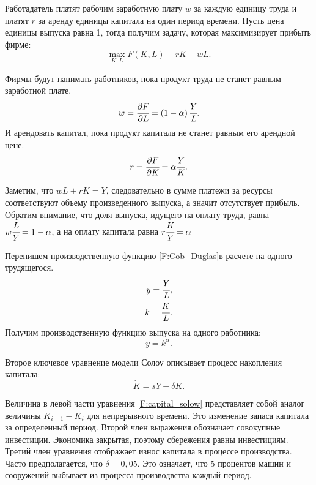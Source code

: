 Работадатель платят рабочим заработную плату $w$ за каждую единицу труда и платят $r$ за аренду единицы капитала на один период времени.
Пусть цена единицы выпуска равна 1, тогда получим задачу, которая максимизирует прибыть фирме:
\begin{equation}
	\max\limits_{K, L} F(K,L) - rK - wL\text{.}
\end{equation}

Фирмы будут нанимать работников, пока продукт труда не станет равным заработной плате.
\begin{equation*}
	w = \cfrac{\partial F}{\partial L} = \left(1-\alpha\right)\cfrac{Y}{L}\text{.}
\end{equation*}
И арендовать капитал, пока продукт капитала не станет равным его арендной цене.
\begin{equation*}
	r = \cfrac{\partial F}{\partial K} = \alpha\cfrac{Y}{K}\text{.}
\end{equation*}

Заметим, что $wL + rK = Y$, следовательно в сумме платежи за ресурсы соответствуют объему произведенного выпуска, а значит отсутствует прибыль.
Обратим внимание, что доля выпуска, идущего на оплату труда, равна $w\cfrac{L}{Y} = 1 - \alpha$, а на оплату капитала равна $r\cfrac{K}{Y} = \alpha$

Перепишем производственную функцию \ref{F:Cob_Duglas}в расчете на одного трудящегося.
\begin{align*}
y = \cfrac{Y}{L}\text{,}\\
k = \cfrac{K}{L}\text{.}
\end{align*}
Получим производственную функцию выпуска на одного работника:
\begin{equation*}
	y = k^{\alpha}\text{.}
\end{equation*}

Второе ключевое уравнение модели Солоу описывает процесс накопления капитала:
\begin{equation}
\dot{K} = sY-\delta K \text{.}
\label{F:capital_solow}
\end{equation}

Величина в левой части уравнения \ref{F:capital_solow} представляет собой аналог величины $K_{i-1} - K_{i}$ для непрерывного времени.
Это изменение запаса капитала за определенный период.
Второй член выражения обозначает совокупные инвестиции.
Экономика закрытая, поэтому сбережения равны инвестициям.
Третий член уравнения отображает износ капитала в процессе производства.
Часто предполагается, что $\delta = 0,05$.
Это означает, что 5 процентов машин и сооружений выбывает из процесса производвства каждый период.

